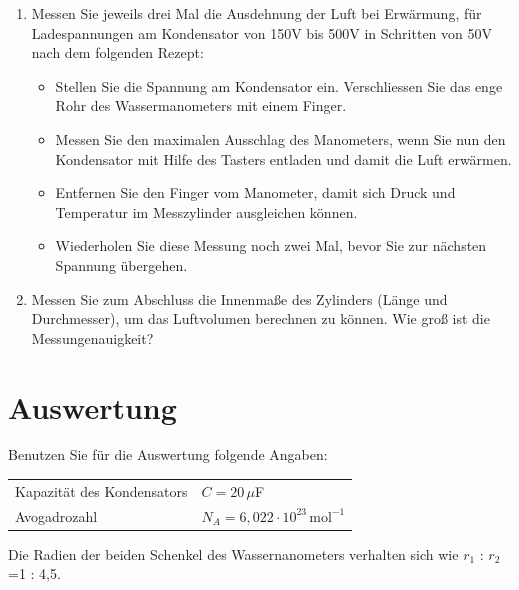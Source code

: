 \begin{enumerate}
 \item Messen Sie jeweils drei Mal die Ausdehnung der Luft bei Erwärmung, für Ladespannungen am Kondensator von 150\;V bis 500\;V in Schritten von 50\;V nach dem folgenden Rezept: 
  \begin{itemize}
	 \item Stellen Sie die Spannung am Kondensator ein. Verschliessen Sie das enge Rohr des Wassermanometers mit einem Finger.
	 \item Messen Sie den maximalen Ausschlag des Manometers, wenn Sie nun den Kondensator mit Hilfe des Tasters entladen und damit die Luft erwärmen.
	 \item Entfernen Sie den Finger vom Manometer, damit sich Druck und Temperatur im Messzylinder ausgleichen können.
	 \item Wiederholen Sie diese Messung noch zwei Mal, bevor Sie zur nächsten Spannung übergehen.
	\end{itemize}
 \item Messen Sie zum Abschluss die Innenmaße des Zylinders (Länge und Durchmesser), um das Luftvolumen berechnen zu können. Wie groß ist die Messungenauigkeit?
\end{enumerate}

\section{Auswertung} 

Benutzen Sie für die Auswertung folgende Angaben:
\begin{table}[h]
		\begin{tabular}{ll}
			Kapazität des Kondensators & $C = 20\,\mu$F \\
			Avogadrozahl & $N_A = 6,022\cdot 10^{23}\,\mathrm{mol}^{-1}$
		\end{tabular}
\end{table}

\noindent
Die Radien der beiden Schenkel des Wassernanometers verhalten sich wie $r_1$ : $r_2$ =1 : 4,5.

